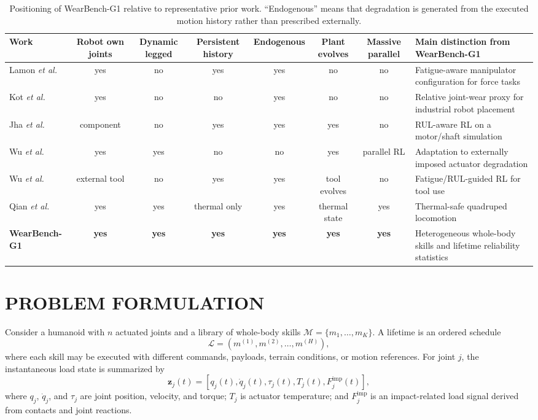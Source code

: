 \documentclass[letterpaper,10pt,conference]{ieeeconf}
\begin{document}
\begin{table}[t]
\caption{Positioning of WearBench-G1 relative to representative prior work. ``Endogenous'' means that degradation is generated from the executed motion history rather than prescribed externally.}
\label{tab:related}
\centering
\scriptsize
\begin{tabularx}{\textwidth}{@{}lccccccX@{}}
\toprule
Work & Robot own joints & Dynamic legged & Persistent history & Endogenous & Plant evolves & Massive parallel & Main distinction from WearBench-G1 \\
\midrule
Lamon \emph{et al.} \cite{lamon2018fatigue} & yes & no & yes & yes & no & no & Fatigue-aware manipulator configuration for force tasks \\
Kot \emph{et al.} \cite{kot2021wear} & yes & no & no & yes & no & no & Relative joint-wear proxy for industrial robot placement \\
Jha \emph{et al.} \cite{jha2020health} & component & no & yes & yes & yes & no & RUL-aware RL on a motor/shaft simulation \\
Wu \emph{et al.} \cite{wu2023adapt} & yes & yes & no & no & yes & parallel RL & Adaptation to externally imposed actuator degradation \\
Wu \emph{et al.} \cite{wu2025tool} & external tool & no & yes & yes & tool evolves & no & Fatigue/RUL-guided RL for tool use \\
Qian \emph{et al.} \cite{qian2026thermal} & yes & yes & thermal only & yes & thermal state & yes & Thermal-safe quadruped locomotion \\
\textbf{WearBench-G1} & \textbf{yes} & \textbf{yes} & \textbf{yes} & \textbf{yes} & \textbf{yes} & \textbf{yes} & Heterogeneous whole-body skills and lifetime reliability statistics \\
\bottomrule
\end{tabularx}
\end{table}

\section{PROBLEM FORMULATION}

Consider a humanoid with $n$ actuated joints and a library of whole-body skills $\mathcal{M}=\{m_1,\ldots,m_K\}$. A lifetime is an ordered schedule
\begin{equation}
\mathcal{L} = (m^{(1)},m^{(2)},\ldots,m^{(H)}),
\label{eq:lifetime}
\end{equation}
where each skill may be executed with different commands, payloads, terrain conditions, or motion references. For joint $j$, the instantaneous load state is summarized by
\begin{equation}
\mathbf{z}_j(t)=
\left[q_j(t),\dot q_j(t),\tau_j(t),T_j(t),F^{\mathrm{imp}}_j(t)\right],
\label{eq:loadstate}
\end{equation}
where $q_j$, $\dot q_j$, and $\tau_j$ are joint position, velocity, and torque; $T_j$ is actuator temperature; and $F^{\mathrm{imp}}_j$ is an impact-related load signal derived from contacts and joint reactions.
\end{document}
